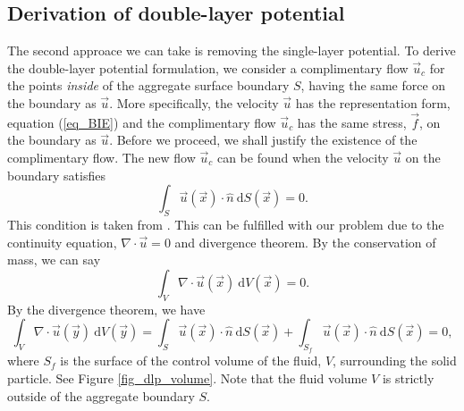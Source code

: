 \subsection{Derivation of double-layer potential}
The second approace we can take is removing the single-layer potential. 
To derive the double-layer potential formulation, we consider a complimentary flow $\vec{u}_c$ 
for the points \textit{inside} of the aggregate surface boundary $S$, having the same force on the boundary as $\vec{u}$. More specifically, the velocity $\vec{u}$  has the representation form, equation (\ref{eq_BIE}) and the complimentary flow $\vec{u}_c$ has the same stress, $\vec{f}$, on the boundary as $\vec{u}$. Before we proceed, we shall justify the existence of the complimentary flow.
The new flow $\vec{u}_c$ can be found when the velocity $\vec{u}$ on the boundary satisfies
\begin{equation}
 	\int_S \vec{u}(\vec{x}) \cdot \hat{n} \ \text{d}S(\vec{x})=0. 
	\label{eq_dlp_constraint}
\end{equation}
This condition is taken from \cite{pozrikidis_boundary_1992}.
This can be fulfilled with our problem due to the continuity equation, $\nabla \cdot \vec{u}= 0$ and divergence theorem.
By the conservation of mass, we can say
\begin{equation}
 	\int_V  \nabla \cdot \vec{u}(\vec{x}) \ \text{d}V (\vec{x}) 
		=0. 
	\label{eq_constraint_v}
\end{equation}
By the divergence theorem, we have
\begin{equation}
	\int_V  \nabla \cdot \vec{u}(\vec{y}) \ \text{d}V (\vec{y})   = 
\int_{S } \vec{u}(\vec{x}) \cdot \hat{n} \ \text{d}S(\vec{x})
+ \int_{S_f} \vec{u}(\vec{x}) \cdot \hat{n} \ \text{d}S(\vec{x})=0,
\label{eq_div}
\end{equation}
where $S_f$ is the surface of the control volume of the fluid, $V$, surrounding the solid particle. See Figure \ref{fig_dlp_volume}.
Note that the fluid volume $V$ is strictly outside of the aggregate boundary $S$. 
